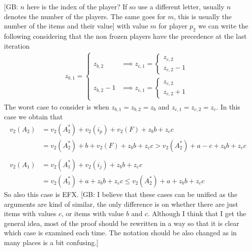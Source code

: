 \documentclass{article}
\newcommand{\gb}[1]{{\color{red}[GB: #1]}}
\begin{document}
\gb{$n$ here is the index of the player? If so use a different letter, usually $n$ denotes the number of the players. The same goes for $m$, this is usually the number of the items and their value} with value $m$ for player $p_2$ we can write the following considering that the non frozen players have the precedence at the last iteration
\begin{align*}
z_{b,1} = \begin{cases} 
z_{b,2} &\implies z_{c,1} = \begin{cases} 
z_{c,2}\\
z_{c,2} -1
\end{cases}   \\
z_{b,2} -1 &\implies z_{c,1} = \begin{cases} 
z_{c,2}\\
z_{c,2} +1
\end{cases}   
\end{cases}
\end{align*}
The worst case to consider is when $z_{b,1} = z_{b,2} = z_b$ and $z_{c,1} = z_{c,2} = z_c$. In this case we obtain that
\begin{align*}
    v_2(A_2) &= v_2(A_2^*) + v_2(i_p) + v_2(F) + z_b b + z_cc\\
    &= v_2(A_2^*) + b + v_2(F) + z_bb +  z_cc > v_2(A_2^*) + a-c + z_b b + z_cc\\\\
    v_2(A_1) &= v_2(A_1^*) + v_2(i_j) + z_bb + z_cc \\
    &=v_2(A_1^*) + a + z_bb + z_cc\le v_2(A_2^*) + a + z_bb + z_cc
\end{align*}
So also this case is EFX. 
\gb{I believe that these cases can be unified as the arguments are kind of similar, the only difference is on whether there are just items with values $c$, or items with value $b$ and $c$. Although I think that I get the general idea, most of the proof should be rewritten in a way so that it is clear which case is examined each time. The notation should be also changed as in many places is a bit confusing.}
\end{document}
